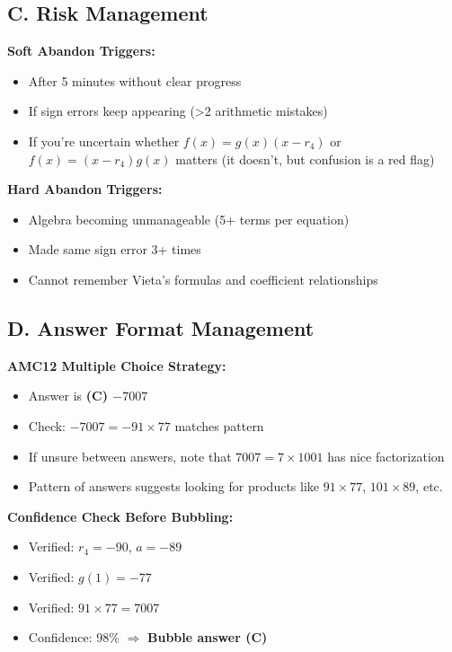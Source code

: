 \documentclass[]{article}
\begin{document}
\begin{competitionbox}
\subsection*{C. Risk Management}

\textbf{Soft Abandon Triggers:}
\begin{itemize}[leftmargin=*]
    \item After 5 minutes without clear progress
    \item If sign errors keep appearing (>2 arithmetic mistakes)
    \item If you're uncertain whether $f(x) = g(x)(x-r_4)$ or $f(x) = (x-r_4)g(x)$ matters (it doesn't, but confusion is a red flag)
\end{itemize}

\textbf{Hard Abandon Triggers:}
\begin{itemize}[leftmargin=*]
    \item Algebra becoming unmanageable (5+ terms per equation)
    \item Made same sign error 3+ times
    \item Cannot remember Vieta's formulas and coefficient relationships
\end{itemize}

\subsection*{D. Answer Format Management}

\textbf{AMC12 Multiple Choice Strategy:}
\begin{itemize}[leftmargin=*]
    \item Answer is \textbf{(C) $-7007$}
    \item Check: $-7007 = -91 \times 77$ matches pattern
    \item If unsure between answers, note that $7007 = 7 \times 1001$ has nice factorization
    \item Pattern of answers suggests looking for products like $91 \times 77$, $101 \times 89$, etc.
\end{itemize}

\textbf{Confidence Check Before Bubbling:}
\begin{itemize}[leftmargin=*]
    \item Verified: $r_4 = -90$, $a = -89$
    \item Verified: $g(1) = -77$
    \item Verified: $91 \times 77 = 7007$
    \item Confidence: 98\% $\Rightarrow$ \textbf{Bubble answer (C)}
\end{itemize}
\end{competitionbox}
\end{document}
